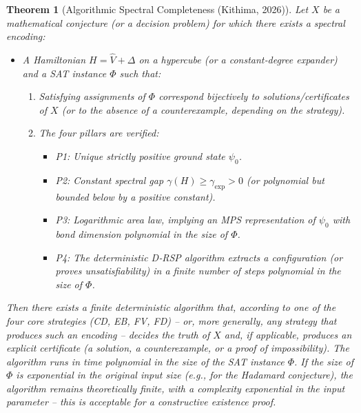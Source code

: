 \documentclass[11pt,a4paper]{article}
\newtheorem{theorem}{Theorem}[section]
\begin{document}
\begin{theorem}[Algorithmic Spectral Completeness (Kithima, 2026)]
Let \(X\) be a mathematical conjecture (or a decision problem) for which there exists a spectral encoding:

\begin{itemize}
\item A Hamiltonian \(H = \hat{V} +\Delta\) on a hypercube (or a constant‑degree expander) and a SAT instance \(\Phi\) such that:
  \begin{enumerate}
  \item Satisfying assignments of \(\Phi\) correspond bijectively to solutions/certificates of \(X\) (or to the absence of a counterexample, depending on the strategy).
  \item The four pillars are verified:
    \begin{itemize}
    \item P1: Unique strictly positive ground state \(\psi_0\).
    \item P2: Constant spectral gap \(\gamma(H)\geq \gamma_{\mathrm{exp}} > 0\) (or polynomial but bounded below by a positive constant).
    \item P3: Logarithmic area law, implying an MPS representation of \(\psi_0\) with bond dimension polynomial in the size of \(\Phi\).
    \item P4: The deterministic D‑RSP algorithm extracts a configuration (or proves unsatisfiability) in a finite number of steps polynomial in the size of \(\Phi\).
    \end{itemize}
  \end{enumerate}
\end{itemize}
Then there exists a finite deterministic algorithm that, according to one of the four core strategies (CD, EB, FV, FD) – or, more generally, any strategy that produces such an encoding – decides the truth of \(X\) and, if applicable, produces an explicit certificate (a solution, a counterexample, or a proof of impossibility). The algorithm runs in time polynomial in the size of the SAT instance \(\Phi\). If the size of \(\Phi\) is exponential in the original input size (e.g., for the Hadamard conjecture), the algorithm remains theoretically finite, with a complexity exponential in the input parameter – this is acceptable for a constructive existence proof.
\end{theorem}
\end{document}
